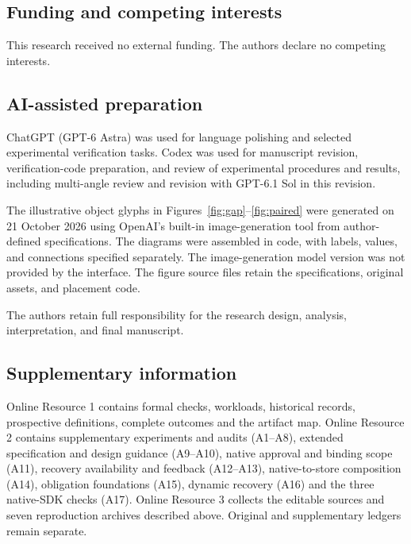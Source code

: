 \documentclass[pdflatex,sn-basic]{sn-jnl}
\begin{document}
\subsection*{Funding and competing interests}
This research received no external funding. The authors declare no competing interests.

\subsection*{AI-assisted preparation}
ChatGPT (GPT-6 Astra) was used for language polishing and selected experimental verification tasks. Codex was used for manuscript revision, verification-code preparation, and review of experimental procedures and results, including multi-angle review and revision with GPT-6.1 Sol in this revision.

The illustrative object glyphs in Figures~\ref{fig:gap}--\ref{fig:paired} were generated on 21 October 2026 using OpenAI's built-in image-generation tool from author-defined specifications. The diagrams were assembled in code, with labels, values, and connections specified separately. The image-generation model version was not provided by the interface. The figure source files retain the specifications, original assets, and placement code.

The authors retain full responsibility for the research design, analysis, interpretation, and final manuscript.

\subsection*{Supplementary information}
Online Resource 1 contains formal checks, workloads, historical records, prospective definitions, complete outcomes and the artifact map. Online Resource 2 contains supplementary experiments and audits (A1--A8), extended specification and design guidance (A9--A10), native approval and binding scope (A11), recovery availability and feedback (A12--A13), native-to-store composition (A14), obligation foundations (A15), dynamic recovery (A16) and the three native-SDK checks (A17). Online Resource 3 collects the editable sources and seven reproduction archives described above. Original and supplementary ledgers remain separate.

\setlength{\bibsep}{0.5em}

\end{document}
